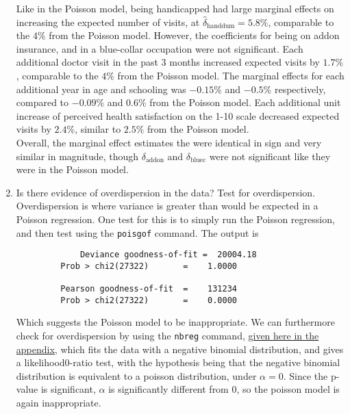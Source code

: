\documentclass{article}
\begin{document}
\begin{enumerate}[label=(\alph*)]
Like in the Poisson model, being handicapped had large marginal effects on increasing the expected number of visits, at $\hat{\delta}_{\text{handdum}} =5.8 \% $, comparable to the $4\%$ from the Poisson model. However, the coefficients for being on addon insurance, and in a blue-collar occupation were not significant. Each additional doctor visit in the past 3 months increased expected visits by $1.7\%$, comparable to the $4\%$ from the Poisson model. The marginal effects for each additional year in age and schooling was $-0.15\%$ and $-0.5\%$ respectively, compared to $-0.09\%$ and $0.6\%$ from the Poisson model. Each additional unit increase of  perceived health satisfaction on the 1-10 scale decreased expected visits by $2.4\%$, similar to $2.5\%$ from the Poisson model.\\

Overall, the marginal effect estimates the were identical in sign and very similar in magnitude, though $\delta_{\text{addon}}$ and $\delta_{\text{bluec}}$ were not significant like they were in the Poisson model.



\item Is there evidence of overdispersion in the data? Test for overdispersion.\\

Overdispersion is where variance is greater than would be expected in a Poisson regression. One test for this is to simply run the Poisson regression, and then test using the \texttt{poisgof} command. The output is \begin{verbatim}
	         Deviance goodness-of-fit =  20004.18
         Prob > chi2(27322)       =    1.0000

         Pearson goodness-of-fit  =    131234
         Prob > chi2(27322)       =    0.0000
\end{verbatim}
Which suggests the Poisson model to be inappropriate. We can furthermore check for overdispersion by using the \texttt{nbreg} command, \hyperlink{nbreg}{given here in the appendix}, which fits the data with a negative binomial distribution, and gives a likelihood0-ratio test, with the hypothesis being that the negative binomial distribution is equivalent to a poisson distribution, under $\alpha = 0$. Since the p-value is significant, $\alpha$ is significantly different from 0, so the poisson model is again inappropriate.


\end{enumerate}

\newpage
\end{document}
